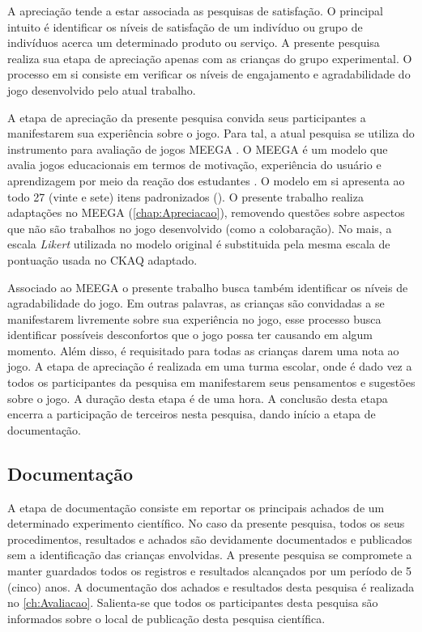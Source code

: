 A apreciação tende a estar associada as pesquisas de satisfação. O principal intuito é identificar os níveis de satisfação de um indivíduo ou grupo de indivíduos acerca um determinado produto ou serviço. A presente pesquisa realiza sua etapa de apreciação apenas com as crianças do grupo experimental. O processo em si consiste em verificar os níveis de engajamento e agradabilidade do jogo desenvolvido pelo atual trabalho.  

A etapa de apreciação da presente pesquisa convida seus participantes a manifestarem sua experiência sobre o jogo. Para tal, a atual pesquisa se utiliza do instrumento para avaliação de jogos \ac{MEEGA} \cite{savi2011avaliacao}. O \ac{MEEGA} é um modelo que avalia jogos educacionais em termos de motivação, experiência do usuário e aprendizagem por meio da reação dos estudantes \cite{petri2019meega+}. O modelo em si apresenta ao todo 27 (vinte e sete) itens padronizados (). O presente trabalho realiza adaptações no \ac{MEEGA} (\autoref{chap:Apreciacao}), removendo questões sobre aspectos que não são trabalhos no jogo desenvolvido (como a colobaração). No mais, a escala \textit{Likert} utilizada no modelo original é substituida pela mesma escala de pontuação usada no \ac{CKAQ} adaptado.

Associado ao \ac{MEEGA} o presente trabalho busca também identificar os níveis de agradabilidade do jogo. Em outras palavras, as crianças são convidadas a se manifestarem livremente sobre sua experiência no jogo, esse processo busca identificar possíveis desconfortos que o jogo possa ter causando em algum momento. Além disso, é requisitado para todas as crianças darem uma nota ao jogo. A etapa de apreciação é realizada em uma turma escolar, onde é dado vez a todos os participantes da pesquisa em manifestarem seus pensamentos e sugestões sobre o jogo. A duração desta etapa é de uma hora. A conclusão desta etapa encerra a participação de terceiros nesta pesquisa, dando início a etapa de documentação. 

\subsection{Documentação}\label{subsec:documentacao}

A etapa de documentação consiste em reportar os principais achados de um determinado experimento científico. No caso da presente pesquisa, todos os seus procedimentos, resultados e achados são devidamente documentados e publicados sem a identificação das crianças envolvidas. A presente pesquisa se compromete a manter guardados todos os registros e resultados alcançados por um período de 5 (cinco) anos. A documentação dos achados e resultados desta pesquisa é realizada no \autoref{ch:Avaliacao}. Salienta-se que todos os participantes desta pesquisa são informados sobre o local de publicação desta pesquisa científica. 

